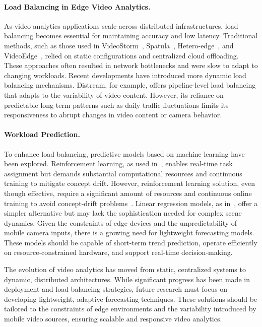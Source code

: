 \paragraph{Load Balancing in Edge Video Analytics.}
As video analytics applications scale across distributed infrastructures, load balancing becomes essential for maintaining accuracy and low latency. Traditional methods, such as those used in VideoStorm~\cite{201465videostorm}, Spatula~\cite{jain2020spatula}, Hetero-edge~\cite{zhang2019hetero}, and VideoEdge~\cite{hung2018videoedge}, relied on static configurations and centralized cloud offloading. These approaches often resulted in network bottlenecks and were slow to adapt to changing workloads.
Recent developments have introduced more dynamic load balancing mechanisms. Distream, for example, offers pipeline-level load balancing that adapts to the variability of video content. However, its reliance on predictable long-term patterns such as daily traffic fluctuations limits its responsiveness to abrupt changes in video content or camera behavior.

\paragraph{Workload Prediction.}

To enhance load balancing, predictive models based on machine learning have been explored. Reinforcement learning, as used in~\cite{yuan2021online}, enables real-time task assignment but demands substantial computational resources and continuous training to mitigate concept drift. However, reinforcement learning solution, even though effective, require a significant amount of resources and continuous online training to avoid concept-drift problems~\cite{zhang2020reinforcement}. Linear regression models, as in~\cite{kombi2017preventive}, offer a simpler alternative but may lack the sophistication needed for complex scene dynamics.
Given the constraints of edge devices and the unpredictability of mobile camera inputs, there is a growing need for lightweight forecasting models. These models should be capable of short-term trend prediction, operate efficiently on resource-constrained hardware, and support real-time decision-making.


The evolution of video analytics has moved from static, centralized systems to dynamic, distributed architectures. While significant progress has been made in deployment and load balancing strategies, future research must focus on developing lightweight, adaptive forecasting techniques. These solutions should be tailored to the constraints of edge environments and the variability introduced by mobile video sources, ensuring scalable and responsive video analytics.


